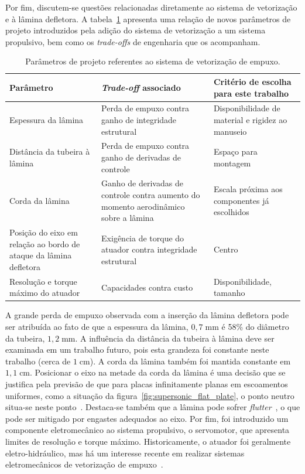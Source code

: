 Por fim, discutem-se questões relacionadas diretamente ao sistema de vetorização e à lâmina defletora. A tabela~\ref{tab:proj_params} apresenta uma relação de novos parâmetros de projeto introduzidos pela adição do sistema de vetorização a um sistema propulsivo, bem como os \textit{trade-offs} de engenharia que os acompanham.

\begin{table}[htbp]
    \centering\begin{tabular}{p{.3\linewidth}p{.3\linewidth}p{.3\linewidth}} \toprule
        Parâmetro & \textit{Trade-off} associado & Critério de escolha para este trabalho \\[.3cm] \midrule
        Espessura da lâmina & Perda de empuxo contra ganho de integridade estrutural & Disponibilidade de material e rigidez ao manuseio  \\[.3cm]
        Distância da tubeira à lâmina & Perda de empuxo contra ganho de derivadas de controle & Espaço para montagem\\[.3cm]
        Corda da lâmina & Ganho de derivadas de controle contra aumento do momento aerodinâmico sobre a lâmina & Escala próxima aos componentes já escolhidos\\[.3cm]
        Posição do eixo em relação ao bordo de ataque da lâmina defletora & Exigência de torque do atuador contra integridade estrutural & Centro\\[.3cm]
        Resolução e torque máximo do atuador & Capacidades contra custo & Disponibilidade, tamanho \\ \bottomrule
    \end{tabular}
    \caption{Parâmetros de projeto referentes ao sistema de vetorização de empuxo.}\label{tab:proj_params}
\end{table}

A grande perda de empuxo observada com a inserção da lâmina defletora pode ser atribuída ao fato de que a espessura da lâmina, \(0,7\;\mathrm{mm}\) é 58\% do diâmetro da tubeira, \(1,2\;\mathrm{mm}\). A influência da distância da tubeira à lâmina deve ser examinada em um trabalho futuro, pois esta grandeza foi constante neste trabalho (cerca de \(1\;\mathrm{cm}\)). A corda da lâmina também foi mantida constante em \(1,1\;\mathrm{cm}\). Posicionar o eixo na metade da corda da lâmina é uma decisão que se justifica pela previsão de que para placas infinitamente planas em escoamentos uniformes, como a situação da figura~\ref{fig:supersonic_flat_plate}, o ponto neutro situa-se neste ponto~\cite{anderson}. Destaca-se também que a lâmina pode sofrer \textit{flutter}~\cite{flutter}, o que pode ser mitigado por engastes adequados ao eixo. Por fim, foi introduzido um componente eletromecânico ao sistema propulsivo, o servomotor, que apresenta limites de resolução e torque máximo. Historicamente, o atuador foi geralmente eletro-hidráulico, mas há um interesse recente em realizar sistemas eletromecânicos de vetorização de empuxo~\cite{etvc}.